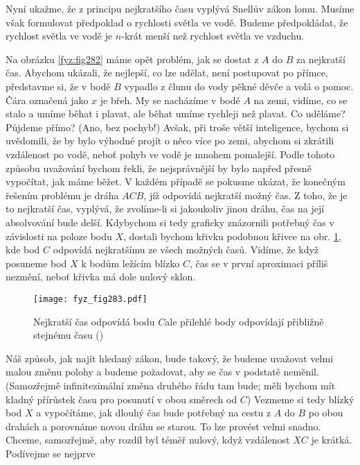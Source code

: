 {    Nyní ukažme, že z principu nejkratšího času vyplývá Snellův zákon lomu. Musíme však formulovat 
    předpoklad o rychlosti světla ve vodě. Budeme předpokládat, že rychlost světla ve vodě je 
    \(n\)-krát menší než rychlost světla ve vzduchu.
    
    Na obrázku \ref{fyz:fig282} máme opět problém, jak se dostat z \(A\) do \(B\) za nejkratší čas. 
    Abychom ukázali, že nejlepší, co lze udělat, není postupovat po přímce, představme si, že v 
    bodě \(B\) vypadlo z člunu do vody pěkné děvče a volá o pomoc. Čára označená jako \(x\) je 
    břeh. My se nacházíme v bodě \(A\) na zemi, vidíme, co se stalo a umíme běhat i plavat, ale 
    běhat umíme rychleji než plavat. Co uděláme? Půjdeme přímo? (Ano, bez pochyb!) Avšak, při troše 
    větší inteligence, bychom si uvědomili, že by bylo výhodné projít o něco více po zemi, abychom 
    si zkrátili vzdálenost po vodě, neboť pohyb ve vodě je mnohem pomalejší. Podle tohoto způsobu 
    uvažování bychom řekli, že nejsprávnější by bylo napřed přesně vypočítat, jak máme běžet. V 
    každém případě se pokusme ukázat, že konečným řešením problému je dráha \(ACB\), jíž odpovídá 
    nejkratší možný čas. Z toho, že je to nejkratší čas, vyplývá, že zvolíme-li si jakoukoliv jinou 
    dráhu, čas na její absolvování bude delší. Kdybychom si tedy graficky znázornili potřebný čas v 
    závislosti na poloze bodu \(X\), dostali bychom křivku podobnou křivce na obr. 
    \ref{fyz:fig283}, kde bod \(C\) odpovídá nejkratšímu ze všech možných časů. Vidíme, že když 
    posuneme bod \(X\) k bodům ležícím blízko \(C\), čas se v první aproximaci příliš nezmění, 
    neboť křivka má dole nulový sklon.
    \begin{figure}[ht!] %
      \centering
      \texttt{[image: fyz\_fig283.pdf]}
      \caption{Nejkratší čas odpovídá bodu \(C\)ale přilehlé body odpovídají přibližně stejnému času
               (\cite[s.~349]{Feynman01})}
      \label{fyz:fig283}
    \end{figure}
    Náš způsob, jak najít hledaný zákon, bude takový, že budeme uvažovat velmi malou změnu polohy a 
    budeme požadovat, aby se čas v podstatě neměnil. (Samozřejmě infinitezimální změna druhého řádu 
    tam bude; měli bychom mít kladný přírůstek času pro posunutí v obou směrech od \(C\)) Vezmeme 
    si tedy blízký bod \(X\) a vypočítáme, jak dlouhý čas bude potřebný na cestu z \(A\) do \(B\) 
    po obou drahách a porovnáme novou dráhu se starou. To lze provést velmi snadno. Chceme, 
    samozřejmě, aby rozdíl byl téměř nulový, když vzdálenost \(XC\) je krátká. Podívejme se nejprve 
}
